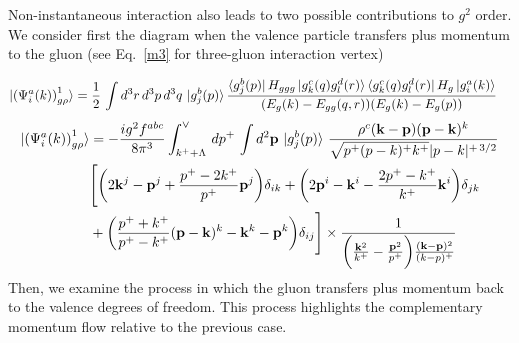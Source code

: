 \documentclass[a4paper,11pt]{article}
\def\v#1{\mathbf{#1}}
\begin{document}
Non-instantaneous interaction also leads to two possible contributions to $g^2$ order. We consider first the diagram when the valence particle transfers plus momentum to the gluon 
(see Eq.~\eqref{m3} for three-gluon interaction vertex)

\begin{figure}[htbp]
    \centering
\end{figure}
\begin{align}\label{onegrho1}
  \ket{ \left(\Psi^{a}_{i}(k) \right)^{1}_{g \rho} }
   & = 
  \frac{1}{2}\, \int d^3 r\, d^3p\, d^3q\, 
   \ket{g^{b}_{j}(p)}
   \frac{ \bra{g^{b}_{j}(p)}H_{ggg}\ket{g^{c}_{k}(q)g^{d}_{l}(r)}\bra{g^{c}_{k}(q)g^{d}_{l}(r)}H_{g}\ket{g^{a}_{i}(k)}}
   {(E_{g}(k)-E_{gg}(q,r))(E_{g}(k)-E_{g}(p))}
   \end{align} 
\begin{align}
 \ket{\left(\Psi^{a}_{i}(k) \right)^{1}_{g \rho} }
   & = -\frac{ig^{2}f^{abc}}{8\pi^{3}}\int_{k^{+}+\Lambda}^{\vee}\,dp^{+}\,\int d^{2}\v{p}\,\ket{g^{b}_{j}(p)}\, \frac{\rho^{c}(\v{k-p})(\v{p-k})^{k}}{\sqrt{p^{+}(p-k)^{+}k^{+}}|p-k|^{+\,3/2}}\notag \\ &   \Bigg[\bigg(2\v{k}^{j}-\v{p}^{j}+\frac{p^{+}-2k^{+}}{p^{+}}\v{p}^{j}\bigg) \delta_{ik} +\bigg(2\v{p}^{i}-\v{k}^{i} -\frac{2p^{+}-k^{+}}{k^{+}}\v{k}^{i}\bigg)\delta_{jk} \notag \\ & +\bigg(\frac{p^{+}+k^{+}}{p^{+}-k^{+}}(\v{p-k})^{k} - \v{k}^{k} - \v{p}^{k}\bigg)\delta_{ij}\Bigg]\times \frac{1}{\bigg(\frac{\v{k}^{2}}{k^{+}}-\frac{\v{p}^{2}}{p^{+}}\bigg)\frac{(\v{k-p})^{2}}{(k-p)^{+}}}
\end{align}
Then, we examine the process in which the gluon transfers plus momentum back to the valence degrees of freedom. This process highlights the complementary momentum flow relative to the previous case.
\end{document}
